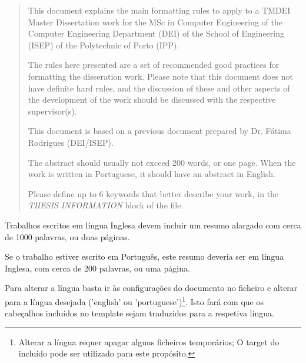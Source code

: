 \frontmatter %

\pagestyle{plain} %


\maketitlepage



\begin{abstract}


This document explains the main formatting rules to apply to a TMDEI Master Dissertation work for the MSc in Computer Engineering of the Computer Engineering Department (DEI) of the School of Engineering (ISEP) of the Polytechnic of Porto (IPP).

The rules here presented are a set of recommended good practices for formatting the disseration work. Please note that this document does not have definite hard rules, and the discussion of these and other aspects of the development of the work should be discussed with the respective supervisor(s).

This document is based on a previous document prepared by Dr. Fátima Rodrigues (DEI/ISEP).

The abstract should usually not exceed 200 words, or one page. When the work is written in Portuguese, it should have an abstract in English.

Please define up to 6 keywords that better describe your work, in the \emph{THESIS INFORMATION} block of the  file.

\end{abstract}

\begin{resume}

Trabalhos escritos em língua Inglesa devem incluir um resumo alargado com cerca de 1000 palavras, ou duas páginas.

Se o trabalho estiver escrito em Português, este resumo deveria ser em língua Inglesa, com cerca de 200 palavras, ou uma página.

Para alterar a língua basta ir às configurações do documento no ficheiro  e alterar para a língua desejada ('english' ou 'portuguese')\footnote{Alterar a língua requer apagar alguns ficheiros temporários; O target  do  incluído pode ser utilizado para este propósito.}. Isto fará com que os cabeçalhos incluídos no template sejam traduzidos para a respetiva língua.

\end{resume}


